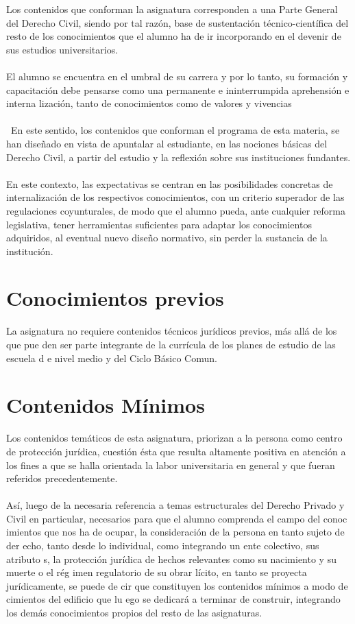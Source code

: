 \documentclass[12pt]{book}
\begin{document}
Los contenidos que conforman la asignatura corresponden a una Parte General del Derecho Civil, siendo por tal razón, base de sustentación técnico-científica del resto de los conocimientos que el alumno ha de ir incorporando en el devenir de sus estudios universitarios.
\\ \\
El alumno se encuentra en el umbral de su carrera y por lo tanto, su formación y capacitación debe pensarse como una permanente e ininterrumpida aprehensión e interna lización, tanto de conocimientos como de valores y vivencias \\ \\\
En este sentido, los contenidos que conforman el programa de esta materia, se han diseñado en vista de apuntalar al estudiante, en las nociones básicas del Derecho Civil, a partir del estudio y la reflexión sobre sus instituciones fundantes. \\ \\
En este contexto, las expectativas se centran en las posibilidades concretas de internalización de los respectivos conocimientos, con un criterio superador de las regulaciones coyunturales, de modo que el alumno pueda, ante cualquier reforma legislativa, tener herramientas suficientes para adaptar los conocimientos adquiridos, al eventual nuevo diseño normativo, sin perder la sustancia de la institución.

\section{Conocimientos previos}
La asignatura no requiere contenidos técnicos jurídicos previos, más allá de los que pue
den ser parte integrante de la currícula de los planes de estudio de las escuela d
e nivel medio y del Ciclo Básico Comun.

\section{Contenidos Mínimos}
Los contenidos temáticos de esta asignatura, priorizan a la persona como centro de
protección jurídica, cuestión ésta que resulta altamente positiva en atención a los fines a que se halla orientada la labor universitaria en general y que fueran referidos precedentemente.
\\ \\
Así, luego de la necesaria referencia a temas estructurales del Derecho Privado y
Civil en particular, necesarios para que el alumno comprenda el campo del conoc
imientos que nos ha de ocupar, la consideración de la persona en tanto sujeto de der
echo, tanto desde lo individual, como integrando un ente colectivo, sus atributo
s, la protección jurídica de hechos relevantes como su nacimiento y su muerte o el rég
imen regulatorio de su obrar lícito, en tanto se proyecta jurídicamente, se puede de
cir que constituyen los contenidos mínimos a modo de cimientos del edificio que lu
ego se dedicará a terminar de construir, integrando los demás conocimientos propios
del resto de las asignaturas.
\\ \\
\end{document}
